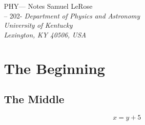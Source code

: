 \documentclass[12pt]{article}
\newcommand{\name}{Samuel LeRose}              %
\newcommand{\semester}{-- 202-}        %
\newcommand{\hwTitle}{PHY--- Notes}  %
\begin{document}
\begin{titlepage}
\begin{center}
    \vspace*{1.5in}
    {\Large{\hwTitle}}
    \vskip 0.25in \name\\
    \semester
    \vskip 0.25in {\it Department of Physics and Astronomy\\ University of Kentucky\\ Lexington, KY 40506, USA}
\end{center}
\vskip 0.5in
\end{titlepage}


\chapter{The Beginning}

\section{The Middle}

\noindent\lipsum[1-3]

\begin{equation}
    x=y+5
\end{equation}
\end{document}
